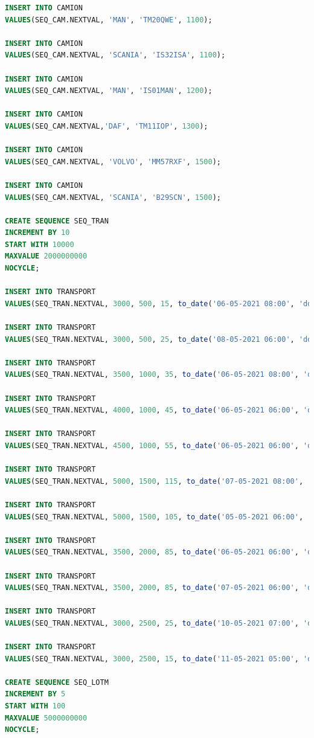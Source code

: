 \documentclass[12pt, a4paper]{article}
\begin{document}
\begin{lstlisting}[language=SQL]
INSERT INTO CAMION
VALUES(SEQ_CAM.NEXTVAL, 'MAN', 'TM20QWE', 1100);

INSERT INTO CAMION
VALUES(SEQ_CAM.NEXTVAL, 'SCANIA', 'IS32ISA', 1100);

INSERT INTO CAMION
VALUES(SEQ_CAM.NEXTVAL, 'MAN', 'IS01MAN', 1200);

INSERT INTO CAMION
VALUES(SEQ_CAM.NEXTVAL,'DAF', 'TM11IOP', 1300);

INSERT INTO CAMION
VALUES(SEQ_CAM.NEXTVAL, 'VOLVO', 'MM57RXF', 1500);

INSERT INTO CAMION
VALUES(SEQ_CAM.NEXTVAL, 'SCANIA', 'B29SCN', 1500);

CREATE SEQUENCE SEQ_TRAN
INCREMENT BY 10
START WITH 10000
MAXVALUE 2000000000
NOCYCLE;

INSERT INTO TRANSPORT
VALUES(SEQ_TRAN.NEXTVAL, 3000, 500, 15, to_date('06-05-2021 08:00', 'dd-mm-yyyy, hh24:mi'));

INSERT INTO TRANSPORT
VALUES(SEQ_TRAN.NEXTVAL, 3000, 500, 25, to_date('08-05-2021 06:00', 'dd-mm-yyyy, hh24:mi'));

INSERT INTO TRANSPORT
VALUES(SEQ_TRAN.NEXTVAL, 3500, 1000, 35, to_date('06-05-2021 08:00', 'dd-mm-yyyy, hh24:mi'));

INSERT INTO TRANSPORT
VALUES(SEQ_TRAN.NEXTVAL, 4000, 1000, 45, to_date('06-05-2021 06:00', 'dd-mm-yyyy, hh24:mi'));

INSERT INTO TRANSPORT
VALUES(SEQ_TRAN.NEXTVAL, 4500, 1000, 55, to_date('06-05-2021 06:00', 'dd-mm-yyyy, hh24:mi'));

INSERT INTO TRANSPORT
VALUES(SEQ_TRAN.NEXTVAL, 5000, 1500, 115, to_date('07-05-2021 08:00', 'dd-mm-yyyy, hh24:mi'));

INSERT INTO TRANSPORT
VALUES(SEQ_TRAN.NEXTVAL, 5000, 1500, 105, to_date('05-05-2021 06:00', 'dd-mm-yyyy, hh24:mi'));

INSERT INTO TRANSPORT
VALUES(SEQ_TRAN.NEXTVAL, 3500, 2000, 85, to_date('06-05-2021 06:00', 'dd-mm-yyyy, hh24:mi'));

INSERT INTO TRANSPORT
VALUES(SEQ_TRAN.NEXTVAL, 3500, 2000, 85, to_date('07-05-2021 06:00', 'dd-mm-yyyy, hh24:mi'));

INSERT INTO TRANSPORT
VALUES(SEQ_TRAN.NEXTVAL, 3000, 2500, 25, to_date('10-05-2021 07:00', 'dd-mm-yyyy, hh24:mi'));

INSERT INTO TRANSPORT
VALUES(SEQ_TRAN.NEXTVAL, 3000, 2500, 15, to_date('11-05-2021 05:00', 'dd-mm-yyyy, hh24:mi'));

CREATE SEQUENCE SEQ_LOTM
INCREMENT BY 5
START WITH 100
MAXVALUE 5000000000
NOCYCLE;


\end{lstlisting}
\end{document}
